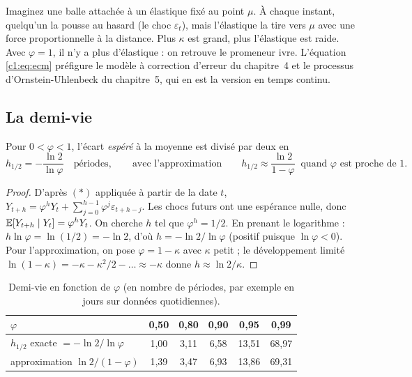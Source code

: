 \begin{intuition}
Imaginez une balle attachée à un élastique fixé au point $\mu$. À chaque instant, quelqu'un la pousse au hasard (le choc $\varepsilon_t$), mais l'élastique la tire vers $\mu$ avec une force proportionnelle à la distance. Plus $\kappa$ est grand, plus l'élastique est raide. Avec $\varphi = 1$, il n'y a plus d'élastique : on retrouve le promeneur ivre. L'équation \eqref{c1:eq:ecm} préfigure le modèle à correction d'erreur du chapitre~4 et le processus d'Ornstein-Uhlenbeck du chapitre~5, qui en est la version en temps continu.
\end{intuition}

\subsection{La demi-vie}

\begin{proposition}\label{c1:prop:hl}
Pour $0<\varphi<1$, l'écart \emph{espéré} à la moyenne est divisé par deux en
\[
h_{1/2} = -\frac{\ln 2}{\ln\varphi} \quad\text{périodes},\qquad\text{avec l'approximation}\qquad h_{1/2} \approx \frac{\ln 2}{1-\varphi}\ \text{ quand } \varphi \text{ est proche de } 1.
\]
\end{proposition}
\begin{proof}
D'après $(\ast)$ appliquée à partir de la date $t$, $Y_{t+h} = \varphi^hY_t + \sum_{j=0}^{h-1}\varphi^j\varepsilon_{t+h-j}$. Les chocs futurs ont une espérance nulle, donc $\mathbb{E}[Y_{t+h}\mid Y_t] = \varphi^h Y_t$. On cherche $h$ tel que $\varphi^h = 1/2$. En prenant le logarithme : $h\ln\varphi = \ln(1/2) = -\ln 2$, d'où $h = -\ln 2/\ln\varphi$ (positif puisque $\ln\varphi<0$). Pour l'approximation, on pose $\varphi = 1-\kappa$ avec $\kappa$ petit ; le développement limité $\ln(1-\kappa) = -\kappa - \kappa^2/2 - \dots \approx -\kappa$ donne $h \approx \ln 2/\kappa$.
\end{proof}

\begin{table}[h]
\centering\small
\caption{Demi-vie en fonction de $\varphi$ (en nombre de périodes, par exemple en jours sur données quotidiennes).}
\label{c1:tab:hl}
\begin{tabular}{lccccc}
\toprule
$\varphi$ & 0,50 & 0,80 & 0,90 & 0,95 & 0,99 \\
\midrule
$h_{1/2}$ exacte $= -\ln2/\ln\varphi$ & 1,00 & 3,11 & 6,58 & 13,51 & 68,97 \\
approximation $\ln 2/(1-\varphi)$ & 1,39 & 3,47 & 6,93 & 13,86 & 69,31 \\
\bottomrule
\end{tabular}
\end{table}

